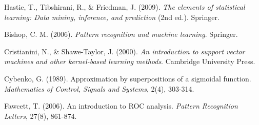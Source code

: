 \documentclass[12pt,a4paper]{article}
\begin{document}
\begin{thebibliography}{15}
 Hastie, T., Tibshirani, R., \& Friedman, J. (2009). \textit{The elements of statistical learning: Data mining, inference, and prediction} (2nd ed.). Springer.

 Bishop, C. M. (2006). \textit{Pattern recognition and machine learning}. Springer.

 Cristianini, N., \& Shawe-Taylor, J. (2000). \textit{An introduction to support vector machines and other kernel-based learning methods}. Cambridge University Press.

 Cybenko, G. (1989). Approximation by superpositions of a sigmoidal function. \textit{Mathematics of Control, Signals and Systems}, 2(4), 303-314.

 Fawcett, T. (2006). An introduction to ROC analysis. \textit{Pattern Recognition Letters}, 27(8), 861-874.

\end{thebibliography}
\end{document}
